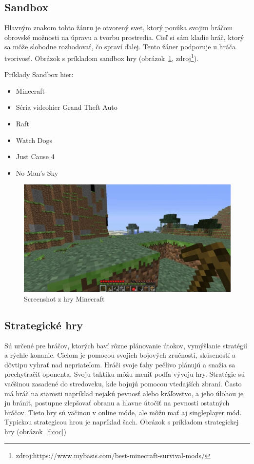 \documentclass[10pt,oneside,slovak,a4paper]{article}
\begin{document}
\pagebreak

\subsection{Sandbox} \label{zanre:sandbox}

Hlavným znakom tohto žánru je otvorený svet, ktorý ponúka svojim hráčom obrovské možnosti na úpravu a tvorbu prostredia. Cieľ si sám kladie hráč, ktorý sa môže slobodne rozhodovať, čo spraví ďalej. Tento žáner podporuje u hráča tvorivosť. Obrázok s príkladom sandbox hry (obrázok~\ref{f:minecraft}, zdroj\footnote{zdroj:https://www.mybasis.com/best-minecraft-survival-mods/}).

Príklady Sandbox hier:
\begin{itemize}
\item Minecraft
\item Séria videohier Grand Theft Auto
\item Raft
\item Watch Dogs
\item Just Cause 4
\item No Man's Sky
\end{itemize}

\begin{figure}[tbh]
\centering
\includegraphics[scale=0.2]{minecraft.jpg}
\caption{Screenshot z hry Minecraft}
\label{f:minecraft}
\end{figure}

\subsection{Strategické hry} \label{zanre:strategicke}

Sú určené pre hráčov, ktorých baví rôzne plánovanie útokov, vymýšlanie stratégií a rýchle konanie. Cieľom je pomocou svojich bojových zručností, skúseností a dôvtipu vyhrať nad nepriateľom. Hráči svoje ťahy pečlivo plánujú a snažia sa prechytračiť oponenta. Svoju taktiku môžu meniť podľa vývoju hry. Stratégie sú vačšinou zasadené do stredoveku, kde bojujú pomocou vtedajších zbraní. Často má hráč na starosti napríklad nejakú pevnosť alebo kráľovstvo, a jeho úlohou je ju brániť, postupne zlepšovať obranu a hlavne útočiť na pevnosti ostatných hráčov. Tieto hry sú väčinou v online móde, ale môžu mať aj singleplayer mód.  Typickou strategicou hrou je napríklad šach. Obrázok s príkladom strategickej hry (obrázok~\ref{f:coc})
\end{document}
